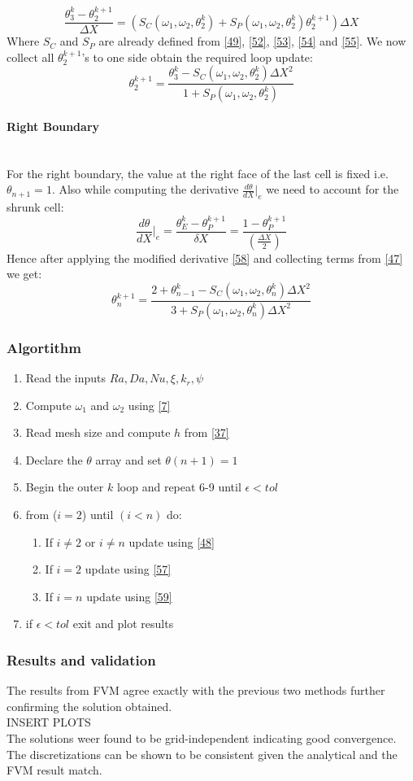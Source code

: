 \documentclass[12pt]{article}
\newcommand{\subsubsubsection}[1]{\paragraph{#1}\mbox{}\\}
\begin{document}
\[
\frac{\theta_3^k -\theta_2^{k+1}}{\Delta X} = (S_{C}(\omega_1, \omega_2, \theta_2^k) + S_{P}(\omega_1, \omega_2, \theta_2^k) \theta_2^{k+1} ) \Delta X \label{56} \tag{56}
\]
Where $S_C$ and $S_P$ are already defined from \eqref{49}, \eqref{52}, \eqref{53}, \eqref{54} and \eqref{55}. We now collect all $\theta_2^{k+1}$'s to one side obtain the required loop update:
\[
\theta_2^{k+1} = \frac{\theta_3^k - S_C(\omega_1,\omega_2,\theta_2^k) \Delta X^2}{1 + S_P(\omega_1, \omega_2, \theta_2^k)} \label{57} \tag{57}
\]
\subsubsubsection{Right Boundary}
For the right boundary, the value at the right face of the last cell is fixed i.e. $\theta_{n+1} = 1$. Also while computing the derivative $\frac{d\theta}{dX}\Bigr|_e$ we need to account for the shrunk cell: 
\[
\frac{d\theta}{dX}\Bigr|_e = \frac{\theta_E^{k}-\theta_P^{k+1}}{\delta X} \tag{58} = \frac{1-\theta_P^{k+1}}{\left(\frac{\Delta X}{2}\right)}\label{58}
\]
Hence after applying the modified derivative \eqref{58} and collecting terms from \eqref{47} we get: 
\[
\theta_n^{k+1} = \frac{2 + \theta_{n-1}^k - S_C(\omega_1,\omega_2,\theta_n^k) \Delta X^2}{3 + S_P(\omega_1,\omega_2,\theta_n^k) \Delta X^2} \label{59} \tag{59}
\]
\subsubsection{Algortithm}
\begin{enumerate}
    \item Read the inputs $Ra, Da, Nu, \xi, k_r, \psi$
    \item Compute $\omega_1$ and $\omega_2$ using \eqref{7}
    \item Read mesh size and compute $h$ from \eqref{37}
    \item Declare the $\theta$ array and set $\theta(n+1)=1$
    \item Begin the outer $k$ loop and repeat 6-9 until $\epsilon<tol$
    \item from ($i=2$) until $(i<n)$ do: 
    \begin{enumerate}
        \item If $i\neq2$ or $i\neq n$ update using \eqref{48}
        \item If $i=2$ update using \eqref{57}
        \item If $i=n$ update using \eqref{59}
    \end{enumerate}
    \item if $\epsilon<tol$ exit and plot results
\end{enumerate}
\subsubsection{Results and validation}
The results from FVM agree exactly with the previous two methods further confirming the solution obtained. \\ INSERT PLOTS \\
The solutions weer found to be grid-independent indicating good convergence. The discretizations can be shown to be consistent given the analytical and the FVM result match. 
\end{document}
